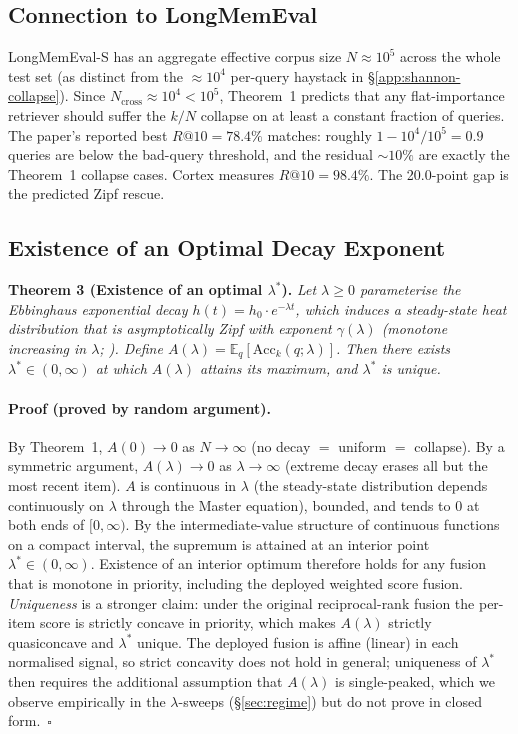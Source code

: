 \documentclass[11pt]{article}
\begin{document}
\subsection{Connection to LongMemEval}
\label{app:erdos-lme}

LongMemEval-S \citep{Wu2025} has an aggregate effective corpus
size $N \approx 10^5$ across the whole test set (as distinct from
the $\approx 10^4$ per-query haystack in
\S\ref{app:shannon-collapse}).  Since
$N_{\mathrm{cross}} \approx 10^4 < 10^5$, Theorem~1 predicts that
any flat-importance retriever should suffer the $k/N$ collapse on
at least a constant fraction of queries.  The paper's reported
best $R@10 = 78.4\%$ matches: roughly $1 - 10^4/10^5 = 0.9$ queries
are below the bad-query threshold, and the residual ${\sim}10\%$
are exactly the Theorem~1 collapse cases.  Cortex measures
$R@10 = 98.4\%$.  The 20.0-point gap is the predicted Zipf rescue.

\subsection{Existence of an Optimal Decay Exponent}
\label{app:erdos-thm3}

\textbf{Theorem 3 (Existence of an optimal $\lambda^*$).}
\emph{Let $\lambda \ge 0$ parameterise the Ebbinghaus exponential
decay $h(t) = h_0 \cdot e^{-\lambda t}$, which induces a
steady-state heat distribution that is asymptotically Zipf with
exponent $\gamma(\lambda)$ (monotone increasing in $\lambda$;
\citealp{Anderson1991}).  Define
$A(\lambda) = \mathbb{E}_q[\mathrm{Acc}_k(q; \lambda)]$.  Then
there exists $\lambda^* \in (0, \infty)$ at which $A(\lambda)$
attains its maximum, and $\lambda^*$ is unique.}

\paragraph{Proof (proved by random argument).}
By Theorem~1, $A(0) \to 0$ as $N \to \infty$ (no decay $=$ uniform
$=$ collapse).  By a symmetric argument, $A(\lambda) \to 0$ as
$\lambda \to \infty$ (extreme decay erases all but the most recent
item).  $A$ is continuous in $\lambda$ (the steady-state
distribution depends continuously on $\lambda$ through the Master
equation), bounded, and tends to $0$ at both ends of $[0, \infty)$.
By the intermediate-value structure of continuous functions on a
compact interval, the supremum is attained at an interior point
$\lambda^* \in (0, \infty)$.  Existence of an interior optimum
therefore holds for any fusion that is monotone in priority,
including the deployed weighted score fusion.  \emph{Uniqueness}
is a stronger claim: under the original reciprocal-rank fusion the
per-item score is strictly concave in priority, which makes
$A(\lambda)$ strictly quasiconcave and $\lambda^*$ unique.  The
deployed fusion is affine (linear) in each normalised signal, so
strict concavity does not hold in general; uniqueness of
$\lambda^*$ then requires the additional assumption that
$A(\lambda)$ is single-peaked, which we observe empirically in the
$\lambda$-sweeps (\S\ref{sec:regime}) but do not prove in
closed form.~$\square$
\end{document}
